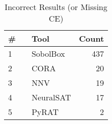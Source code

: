 
\begin{table}[h]
\begin{center}
\caption{Incorrect Results (or Missing CE)} \label{tab:stats4}
{\setlength{\tabcolsep}{2pt}
\begin{tabular}[h]{@{}llr@{}}
\toprule
\textbf{\# ~} & \textbf{Tool} & \textbf{Count}\\
\midrule
1 & SobolBox & 437 \\
2 & CORA & 20 \\
3 & NNV & 19 \\
4 & NeuralSAT & 17 \\
5 & PyRAT & 2 \\
\bottomrule
\end{tabular}
}
\end{center}
\end{table}


